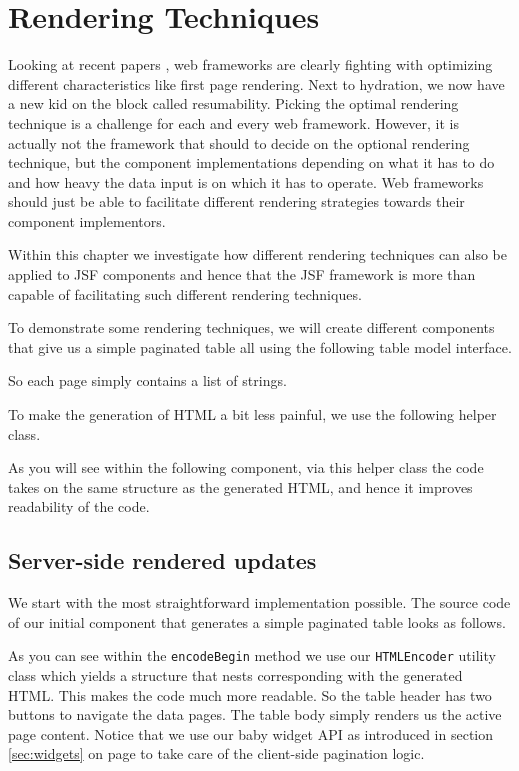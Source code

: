 %

\chapter{Rendering Techniques}

Looking at recent papers \cite{Resumability2024},  web frameworks are clearly fighting with optimizing different characteristics like first page rendering.
Next to hydration, we now have a new kid on the block called resumability.
Picking the optimal rendering technique is a challenge for each and every web framework.
However, it is actually not the framework that should to decide on the optional rendering technique, but the component implementations depending on what it has to do and how heavy the data input is on which it has to operate.
Web frameworks should just be able to facilitate different rendering strategies towards their component implementors.

Within this chapter we investigate how different rendering techniques can also be applied to JSF components and hence that the JSF framework is more than capable of facilitating such different rendering techniques.

To demonstrate some rendering techniques, we will create different components that give us a simple paginated table all using the following table model interface.

So each page simply contains a list of strings.

To make the generation of HTML a bit less painful, we use the following helper class.

As you will see within the following component, via this helper class the code takes on the same structure as the generated HTML, and hence it improves readability of the code.

\section{Server-side rendered updates}
We start with the most straightforward implementation possible.
The source code of our initial component that generates a simple paginated table looks as follows.

As you can see within the \texttt{encodeBegin} method we use our \texttt{HTMLEncoder} utility class which yields a structure that nests corresponding with the generated HTML.
This makes the code much more readable.
So the table header has two buttons to navigate the data pages.
The table body simply renders us the active page content.
Notice that we use our baby widget API as introduced in section \ref{sec:widgets} on page \pageref{sec:widgets} to take care of the client-side pagination logic.

